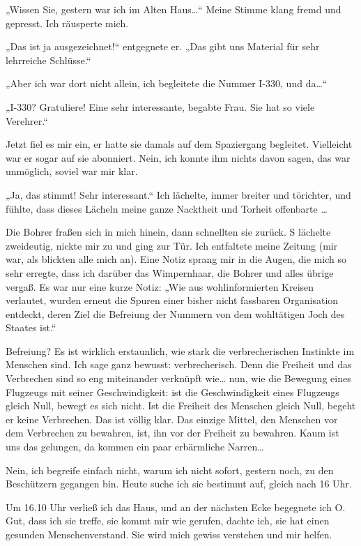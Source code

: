 „Wissen Sie, gestern war ich im Alten Haus\ldots{}“ Meine Stimme klang
fremd und gepresst. Ich räusperte mich.

„Das ist ja ausgezeichnet!“ entgegnete er. „Das gibt uns Material
für sehr lehrreiche Schlüsse.“

„Aber ich war dort nicht allein, ich
begleitete die Nummer I-330, und da\ldots{}“

„I-330? Gratuliere! Eine sehr interessante, begabte Frau. Sie hat
so viele Verehrer.“

Jetzt fiel es mir ein, er hatte sie damals auf dem Spaziergang
begleitet. Vielleicht war er sogar auf sie abonniert. Nein, ich
konnte ihm nichts davon sagen, das war unmöglich, soviel war mir
klar.

„Ja, das stimmt! Sehr interessant.“ Ich lächelte, immer breiter und
törichter, und fühlte, dass dieses Lächeln meine ganze Nacktheit
und Torheit offenbarte \ldots{}

Die Bohrer fraßen sich in mich hinein,
dann schnellten sie zurück. S lächelte zweideutig, nickte mir zu
und ging zur Tür. Ich entfaltete meine Zeitung (mir war, als
blickten alle mich an). Eine Notiz sprang mir in die Augen, die
mich so sehr erregte, dass ich darüber das Wimpernhaar, die Bohrer
und alles übrige vergaß. Es war nur eine kurze Notiz: „Wie aus
wohlinformierten Kreisen verlautet, wurden erneut die Spuren einer
bisher nicht fassbaren Organisation entdeckt, deren Ziel die
Befreiung der Nummern von dem wohltätigen Joch des Staates ist.“

Befreiung? Es ist wirklich erstaunlich, wie stark die
verbrecherischen Instinkte im Menschen sind. Ich sage ganz bewusst:
verbrecherisch. Denn die Freiheit und das Verbrechen sind so eng
miteinander verknüpft wie\ldots{} nun, wie die Bewegung eines Flugzeugs
mit seiner Geschwindigkeit: ist die Geschwindigkeit eines Flugzeugs
gleich Null, bewegt es sich nicht. Ist die Freiheit des Menschen
gleich Null, begeht er keine Verbrechen. Das ist völlig klar. Das
einzige Mittel, den Menschen vor dem Verbrechen zu bewahren, ist,
ihn vor der Freiheit zu bewahren. Kaum ist uns das gelungen, da
kommen ein paar erbärmliche Narren\ldots{}

Nein, ich begreife einfach nicht, warum ich nicht sofort, gestern
noch, zu den Beschützern gegangen bin. Heute suche ich sie bestimmt
auf, gleich nach 16 Uhr.

Um 16.10 Uhr verließ ich das Haus, und an
der nächsten Ecke begegnete ich O. Gut, dass ich sie treffe, sie
kommt mir wie gerufen, dachte ich, sie hat einen gesunden
Menschenverstand. Sie wird mich gewiss verstehen und mir helfen.

